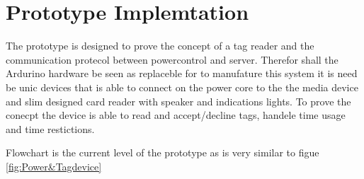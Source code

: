 		
\section{Prototype Implemtation}
The prototype is designed to prove the concept of a tag reader and the communication protecol between powercontrol and server. Therefor shall the Ardurino hardware be seen as replaceble for to manufature this system it is need be unic devices that is able to connect on the power core to the the media device and slim designed card reader with speaker and indications lights. To prove the conecpt the device is able to read and accept/decline tags, handele time usage and time restictions. 


Flowchart is the current level of the prototype as is very similar to figue \ref{fig:Power&Tagdevice} 



    